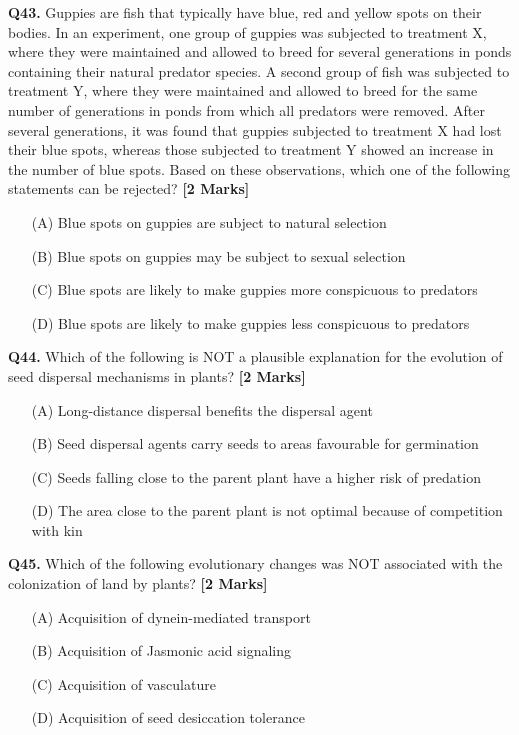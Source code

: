 \documentclass[11pt]{article}
\newcommand{\questionb}[2]{
    \noindent\textbf{Q#2.} #1 \hfill \textbf{[2 Marks]}
}
\begin{document}
\questionb{Guppies are fish that typically have blue, red and yellow spots on their bodies. In an experiment, one group of guppies was subjected to treatment X, where they were maintained and allowed to breed for several generations in ponds containing their natural predator species. A second group of fish was subjected to treatment Y, where they were maintained and allowed to breed for the same number of generations in ponds from which all predators were removed. After several generations, it was found that guppies subjected to treatment X had lost their blue spots, whereas those subjected to treatment Y showed an increase in the number of blue spots. Based on these observations, which one of the following statements can be rejected?}{43}
\begin{enumerate}
    \item[(A)] Blue spots on guppies are subject to natural selection  
    \item[(B)] Blue spots on guppies may be subject to sexual selection  
    \item[(C)] Blue spots are likely to make guppies more conspicuous to predators  
    \item[(D)] Blue spots are likely to make guppies less conspicuous to predators  
\end{enumerate}
\vspace{0.5cm}

\questionb{Which of the following is NOT a plausible explanation for the evolution of seed dispersal mechanisms in plants?}{44}
\begin{enumerate}
    \item[(A)] Long-distance dispersal benefits the dispersal agent  
    \item[(B)] Seed dispersal agents carry seeds to areas favourable for germination  
    \item[(C)] Seeds falling close to the parent plant have a higher risk of predation  
    \item[(D)] The area close to the parent plant is not optimal because of competition with kin  
\end{enumerate}
\vspace{0.5cm}

\questionb{Which of the following evolutionary changes was NOT associated with the colonization of land by plants?}{45}
\begin{enumerate}
    \item[(A)] Acquisition of dynein-mediated transport  
    \item[(B)] Acquisition of Jasmonic acid signaling  
    \item[(C)] Acquisition of vasculature  
    \item[(D)] Acquisition of seed desiccation tolerance  
\end{enumerate}
\vspace{0.5cm}
\end{document}
